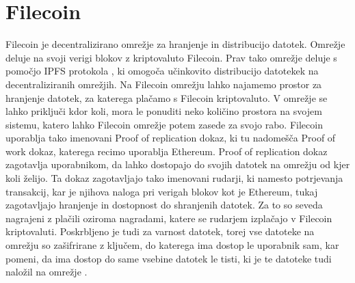 \documentclass[a4paper,12pt,openright]{book}
\begin{document}
\section{Filecoin}
Filecoin je decentralizirano omrežje za hranjenje in distribucijo datotek.
Omrežje deluje na svoji verigi blokov z kriptovaluto Filecoin.
Prav tako omrežje deluje s pomočjo IPFS protokola \cite{IPFS}, ki omogoča učinkovito distribucijo datotekek na decentraliziranih omrežjih.
Na Filecoin omrežju lahko najamemo prostor za hranjenje datotek, za katerega plačamo s Filecoin kriptovaluto.
V omrežje se lahko priključi kdor koli, mora le ponuditi neko količino prostora na svojem sistemu, katero lahko Filecoin omrežje potem zasede za svojo rabo.
Filecoin uporablja tako imenovani Proof of replication dokaz, ki tu nadomešča Proof of work dokaz, katerega recimo uporablja Ethereum.
Proof of replication dokaz zagotavlja uporabnikom, da lahko dostopajo do svojih datotek na omrežju od kjer koli želijo.
Ta dokaz zagotavljajo tako imenovani rudarji, ki namesto potrjevanja transakcij, kar je njihova naloga pri verigah blokov kot je Ethereum, tukaj
zagotavljajo hranjenje in dostopnost do shranjenih datotek.
Za to so seveda nagrajeni z plačili oziroma nagradami, katere se rudarjem izplačajo v Filecoin kriptovaluti.
Poskrbljeno je tudi za varnost datotek, torej vse datoteke na omrežju so zašifrirane z ključem, do katerega ima dostop le uporabnik sam, kar pomeni, 
da ima dostop do same vsebine datotek le tisti, ki je te datoteke tudi naložil na omrežje \cite{filecoin}.
\end{document}
